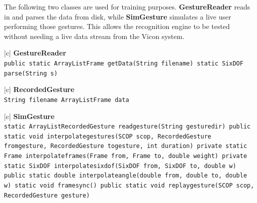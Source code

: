 \documentclass[12pt,a4,notitlepage]{report}
\renewcommand{\_}{\texttt{\symbol{95}}}
\newcommand{\<}{\texttt{\symbol{60}}}
\renewcommand{\>}{\texttt{\symbol{62}}}
\newcommand{\class}[1]{\textbf{#1}}
\newcommand{\variable}[1]{\texttt{#1}}
\begin{document}
The following two classes are used for training purposes. \class{GestureReader} reads in and parses the data from disk, while \class{SimGesture} simulates a live user performing those gestures. This allows the recognition engine to be tested without needing a live data stream from the Vicon system.

\begin{tabular}{|c|} \hline 
\class{GestureReader} \\ \hline
{}
{ \variable{public static ArrayList\<Frame\> getData(String filename) \newline
static SixDOF parse(String s)
} } \\ \hline
\end{tabular}

\begin{tabular}{|c|} \hline 
\class{RecordedGesture} \\ \hline
{}
{ \variable{String filename \newline
ArrayList\<Frame\> data
} } \\ \hline
\end{tabular}

\begin{tabular}{|c|} \hline 
\class{SimGesture} \\ \hline
{}
{ \variable{static ArrayList\<RecordedGesture\> read\_gesture(String gesture\_dir) \newline
public static void interpolate\_gestures(SCOP scop, RecordedGesture from\_gesture, RecordedGesture to\_gesture, int duration) \newline
private static Frame interpolate\_frames(Frame from, Frame to, double weight) \newline
private static SixDOF interpolate\_sixdof(SixDOF from, SixDOF to, double w) \newline
public static double interpolate\_angle(double from, double to, double w) \newline
static void framesync() \newline
public static void replay\_gesture(SCOP scop, RecordedGesture gesture)
} } \\ \hline
\end{tabular}
\end{document}
